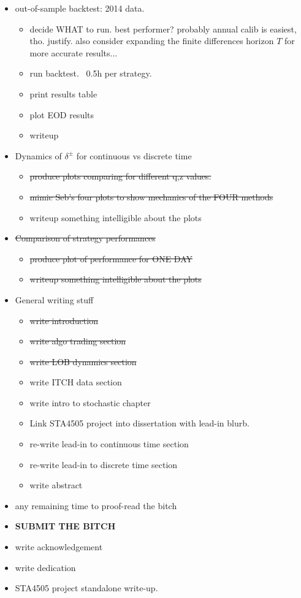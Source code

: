 \documentclass[12pt]{article}
\begin{document}
\begin{itemize}[topsep=0pt,itemsep=0ex,partopsep=0ex,parsep=0ex]
\item out-of-sample backtest: 2014 data.
\begin{itemize}[topsep=0pt,itemsep=0ex,partopsep=0ex,parsep=0ex]
\item decide WHAT to run. best performer? probably annual calib is easiest, tho. justify. also consider expanding the finite differences horizon $T$ for more accurate results...
\item run backtest. ~0.5h per strategy.
\item print results table
\item plot EOD results
\item writeup
\end{itemize}

\item Dynamics of $\delta^\pm$ for continuous vs discrete time
\begin{itemize}[topsep=0pt,itemsep=0ex,partopsep=0ex,parsep=0ex]
\item \st{produce plots comparing for different q,z values.}
\item \st{mimic Seb's four plots to show mechanics of the FOUR methods}
\item writeup something intelligible about the plots

\end{itemize}

\item \st{Comparison of strategy performances}
\begin{itemize}[topsep=0pt,itemsep=0ex,partopsep=0ex,parsep=0ex]
\item \st{produce plot of performance for ONE DAY}
\item \st{writeup something intelligible about the plots}
\end{itemize}

\item General writing stuff
\begin{itemize}[topsep=0pt,itemsep=0ex,partopsep=0ex,parsep=0ex]
\item \st{write introduction}
\item \st{write algo trading section}
\item \st{write LOB dynamics section}
\item write ITCH data section
\item write intro to stochastic chapter
\item Link STA4505 project into dissertation with lead-in blurb.
\item re-write lead-in to continuous time section
\item re-write lead-in to discrete time section
\item write abstract
\end{itemize}

\item any remaining time to proof-read the bitch
\item {\bf SUBMIT THE BITCH}
\item write acknowledgement
\item write dedication
\item STA4505 project standalone write-up.
\end{itemize}
\end{document}
